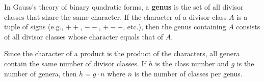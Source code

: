 In Gauss's theory of binary quadratic forms, a \textbf{genus} is the set of all divisor classes that share the same character. If the character of a divisor class $A$ is a tuple of signs (e.g., $++$, $--$, $+-+$, etc.), then the genus containing $A$ consists of all divisor classes whose character equals that of $A$.

Since the character of a product is the product of the characters, all genera contain the same number of divisor classes. If $h$ is the class number and $g$ is the number of genera, then $h = g \cdot n$ where $n$ is the number of classes per genus.
